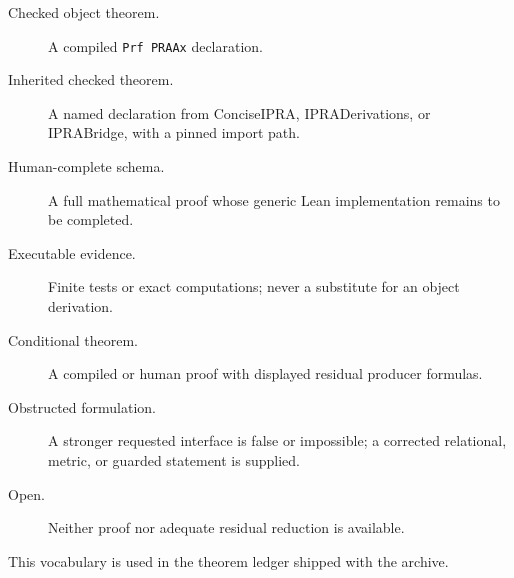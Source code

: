 \begin{description}
\item[Checked object theorem.] A compiled \texttt{Prf PRAAx} declaration.
\item[Inherited checked theorem.] A named declaration from ConciseIPRA,
      IPRADerivations, or IPRABridge, with a pinned import path.
\item[Human-complete schema.] A full mathematical proof whose generic Lean
      implementation remains to be completed.
\item[Executable evidence.] Finite tests or exact computations; never a
      substitute for an object derivation.
\item[Conditional theorem.] A compiled or human proof with displayed residual
      producer formulas.
\item[Obstructed formulation.] A stronger requested interface is false or
      impossible; a corrected relational, metric, or guarded statement is
      supplied.
\item[Open.] Neither proof nor adequate residual reduction is available.
\end{description}

This vocabulary is used in the theorem ledger shipped with the archive.
